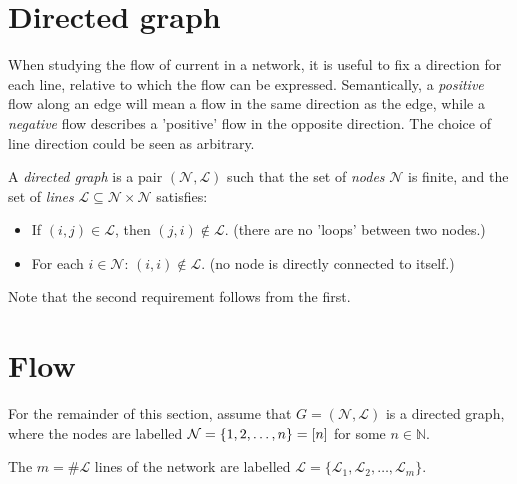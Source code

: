 \documentclass[main.tex]{subfiles}
\begin{document}
\section{Directed graph}
When studying the flow of current in a network, it is useful to fix a direction for each line, relative to which the flow can be expressed.
Semantically, a \emph{positive} flow along an edge will mean a flow in the same direction as the edge, while a \emph{negative} flow describes a 'positive' flow in the opposite direction. The choice of line direction could be seen as arbitrary. 
\begin{definition}
A \emph{directed graph} is a pair $(\mathcal{N},\mathcal{L})$ such that the set of \emph{nodes} $\mathcal{N}$ is finite, and the set of \emph{lines} $\mathcal{L}\subseteq \mathcal{N} \times \mathcal{N}$ satisfies:
\begin{itemize}
    \item If $(i,j) \in \mathcal{L}$, then $(j,i) \notin \mathcal{L}$. (\ie there are no 'loops' between two nodes.)
    \item For each $i \in \mathcal{N}$: $(i,i) \notin \mathcal{L}$. (\ie no node is directly connected to itself.)
\end{itemize}
\end{definition}
\begin{remark}
Note that the second requirement follows from the first.
\end{remark}

\section{Flow}
For the remainder of this section, assume that $G=(\mathcal{N},\mathcal{L})$ is a directed graph, where the nodes are labelled $\mathcal{N}=\{1,2,\dots,n\}=[n]$ for some $n \in \mathbb{N}$.

The $m = \# \mathcal{L}$ lines of the network are labelled $\mathcal{L}=\{\mathcal{L}_1,\mathcal{L}_2,\dots,\mathcal{L}_m\}$.
\end{document}
